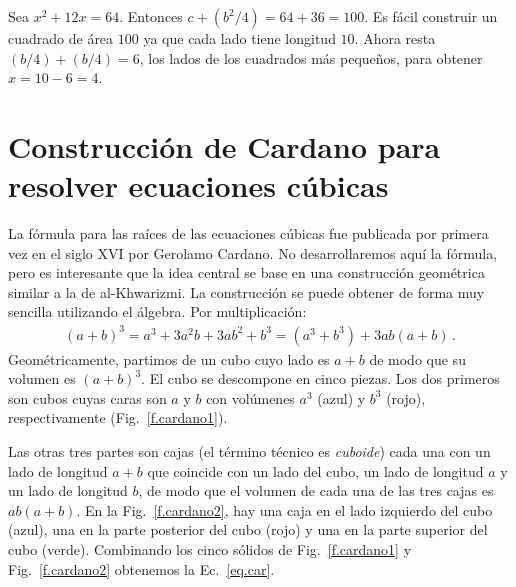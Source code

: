 \begin{example}
Sea $x^2+12x=64$. Entonces $c+(b^2/4)=64+36=100$. Es fácil construir un cuadrado de área $100$ ya que cada lado tiene longitud $10$. Ahora resta $(b/4)+(b/4)=6$, los lados de los cuadrados más pequeños, para obtener $x=10-6=4$.
\end{example}

\section{Construcción de Cardano para resolver ecuaciones cúbicas}\label{s.cardano}

La fórmula para las raíces de las ecuaciones cúbicas fue publicada por primera vez en el siglo XVI por Gerolamo Cardano. No desarrollaremos aquí la fórmula, pero es interesante que la idea central se base en una construcción geométrica similar a la de al-Khwarizmi. La construcción se puede obtener de forma muy sencilla utilizando el álgebra. Por multiplicación:
\begin{align}\label{eq.car}
(a+b)^3=a^3+3a^2b+3ab^2+b^3=(a^3+b^3)+3ab(a+b)\,.
\end{align}
Geométricamente, partimos de un cubo cuyo lado es $a+b$ de modo que su volumen es $(a+b)^3$. El cubo se descompone en cinco piezas. Los dos primeros son cubos cuyas caras son $a$ y $b$ con volúmenes $a^3$ (azul) y $b^3$ (rojo), respectivamente (Fig.~\ref{f.cardano1}).

Las otras tres partes son cajas (el término técnico es \emph{cuboide}) cada una con un lado de longitud $a+b$ que coincide con un lado del cubo, un lado de longitud $a$ y un lado de longitud $b$, de modo que el volumen de cada una de las tres cajas es $ab(a+b)$. En la Fig.~\ref{f.cardano2}, hay una caja en el lado izquierdo del cubo (azul), una en la parte posterior del cubo (rojo) y una en la parte superior del cubo (verde).
Combinando los cinco sólidos de Fig.~\ref{f.cardano1} y Fig.~\ref{f.cardano2} obtenemos la Ec.~\ref{eq.car}.

